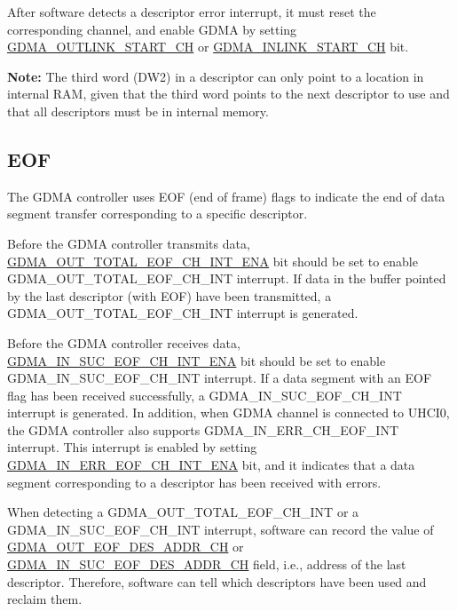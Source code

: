 \documentclass[main\_\_EN.tex]{subfiles}
\begin{document}
After software detects a descriptor error interrupt, it must reset the corresponding channel, and enable GDMA by setting \hyperref[fielddesc:DMAOUTLINKSTARTCHN]{GDMA\_OUTLINK\_START\_CH} or \hyperref[fielddesc:DMAINLINKSTARTCHN]{GDMA\_INLINK\_START\_CH} bit.

{\bfseries Note:} The third word (DW2) in a descriptor can only point to a location in internal RAM, given that the third word points to the next descriptor to use and that all descriptors must be in internal memory.

\subsection{EOF}

The GDMA controller uses EOF (end of frame) flags to indicate the end of data segment transfer corresponding to a specific descriptor.

Before the GDMA controller transmits data, \hyperref[fielddesc:DMAOUTTOTALEOFCHNINTENA]{GDMA\_OUT\_TOTAL\_EOF\_CH\_INT\_ENA} bit should be set to enable GDMA\_OUT\_TOTAL\_EOF\_CH\_INT interrupt. If data in the buffer pointed by the last descriptor (with EOF) have been transmitted, a GDMA\_OUT\_TOTAL\_EOF\_CH\_INT interrupt is generated.

Before the GDMA controller receives data, \hyperref[fielddesc:DMAINSUCEOFCHNINTENA]{GDMA\_IN\_SUC\_EOF\_CH\_INT\_ENA} bit should be set to enable GDMA\_IN\_SUC\_EOF\_CH\_INT interrupt. If a data segment with an EOF flag has been received successfully, a GDMA\_IN\_SUC\_EOF\_CH\_INT interrupt is generated. In addition, when GDMA channel is connected to UHCI0, the GDMA controller also supports GDMA\_IN\_ERR\_CH\_EOF\_INT interrupt. This interrupt is enabled by setting \hyperref[fielddesc:DMAINERREOFCHNINTENA]{GDMA\_IN\_ERR\_EOF\_CH\_INT\_ENA} bit, and it indicates that a data segment corresponding to a descriptor has been received with errors.

When detecting a GDMA\_OUT\_TOTAL\_EOF\_CH\_INT or a GDMA\_IN\_SUC\_EOF\_CH\_INT interrupt, software can record the value of \hyperref[fielddesc:DMAOUTEOFDESADDRCHN]{GDMA\_OUT\_EOF\_DES\_ADDR\_CH} or \hyperref[fielddesc:DMAINSUCEOFDESADDRCHN]{GDMA\_IN\_SUC\_EOF\_DES\_ADDR\_CH} field, i.e., address of the last descriptor. Therefore, software can tell which descriptors have been used and reclaim them.
\end{document}
